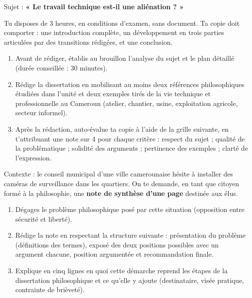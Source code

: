 \documentclass[11pt]{article}
\begin{document}
\begin{exercice}
Sujet : \textbf{« Le travail technique est-il une aliénation ? »}
\par Tu disposes de 3 heures, en conditions d'examen, sans document. Ta copie doit comporter : une introduction complète, un développement en trois parties articulées par des transitions rédigées, et une conclusion.
\begin{enumerate}
\item Avant de rédiger, établis au brouillon l'analyse du sujet et le plan détaillé (durée conseillée : 30 minutes).
\item Rédige la dissertation en mobilisant au moins deux références philosophiques étudiées dans l'unité et deux exemples tirés de la vie technique et professionnelle au Cameroun (atelier, chantier, usine, exploitation agricole, secteur informel).
\item Après la rédaction, auto-évalue ta copie à l'aide de la grille suivante, en t'attribuant une note sur 4 pour chaque critère : respect du sujet ; qualité de la problématique ; solidité des arguments ; pertinence des exemples ; clarté de l'expression.
\end{enumerate}
\end{exercice}

\begin{exercice}
Contexte : le conseil municipal d'une ville camerounaise hésite à installer des caméras de surveillance dans les quartiers. On te demande, en tant que citoyen formé à la philosophie, une \textbf{note de synthèse d'une page} destinée aux élus.
\begin{enumerate}
\item Dégages le problème philosophique posé par cette situation (opposition entre sécurité et liberté).
\item Rédige la note en respectant la structure suivante : présentation du problème (définitions des termes), exposé des deux positions possibles avec un argument chacune, position argumentée et recommandation finale.
\item Explique en cinq lignes en quoi cette démarche reprend les étapes de la dissertation philosophique et ce qu'elle y ajoute (destinataire, visée pratique, contrainte de brièveté).
\end{enumerate}
\end{exercice}

\newpage
\end{document}
